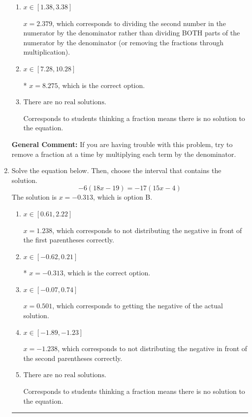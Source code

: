 \documentclass{extbook}[14pt]
\newcommand{\litem}[1]{\item #1

\rule{\textwidth}{0.4pt}}
\begin{document}
\begin{enumerate}
{\begin{enumerate}[label=\Alph*.]
 $x = 36.522$, which corresponds to dividing the coefficients in front of x by the denominator rather than dividing BOTH parts of the numerator by the denominator (or removing the fractions through multiplication).
\item \( x \in [1.38, 3.38] \)

 $x = 2.379$, which corresponds to dividing the second number in the numerator by the denominator rather than dividing BOTH parts of the numerator by the denominator (or removing the fractions through multiplication).
\item \( x \in [7.28, 10.28] \)

* $x = 8.275$, which is the correct option.
\item \( \text{There are no real solutions.} \)

Corresponds to students thinking a fraction means there is no solution to the equation.
\end{enumerate}

\textbf{General Comment:} If you are having trouble with this problem, try to remove a fraction at a time by multiplying each term by the denominator.
}
\litem{
Solve the equation below. Then, choose the interval that contains the solution.
\[ -6(18x -19) = -17(15x -4) \]The solution is \( x = -0.313 \), which is option B.\begin{enumerate}[label=\Alph*.]
\item \( x \in [0.61, 2.22] \)

$x = 1.238$, which corresponds to not distributing the negative in front of the first parentheses correctly.
\item \( x \in [-0.62, 0.21] \)

* $x = -0.313$, which is the correct option.
\item \( x \in [-0.07, 0.74] \)

$x = 0.501$, which corresponds to getting the negative of the actual solution.
\item \( x \in [-1.89, -1.23] \)

$x = -1.238$, which corresponds to not distributing the negative in front of the second parentheses correctly.
\item \( \text{There are no real solutions.} \)

Corresponds to students thinking a fraction means there is no solution to the equation.
\end{enumerate}

}
\end{enumerate}
\end{document}
